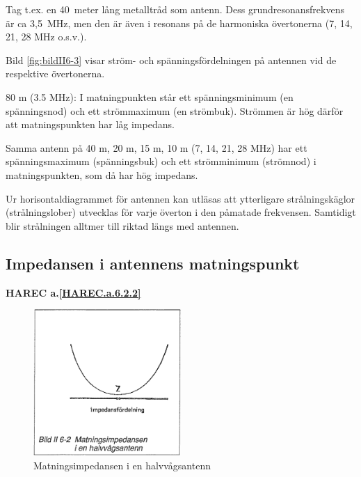 Tag t.ex. en 40~meter lång metalltråd som antenn. Dess
grundresonansfrekvens är ca 3,5~MHz, men den är även i resonans på de
harmoniska övertonerna (7, 14, 21, 28 MHz o.s.v.).

Bild \ref{fig:bildII6-3} visar ström- och spänningsfördelningen på antennen vid de
respektive övertonerna.

80 m (3.5 MHz): I matningpunkten står ett spänningsminimum (en
spänningsnod) och ett strömmaximum (en strömbuk). Strömmen är hög
därför att matningspunkten har låg impedans.

Samma antenn på 40 m, 20 m, 15 m, 10 m (7, 14, 21, 28 MHz) har ett
spänningsmaximum (spänningsbuk) och ett strömminimum (strömnod) i
matningspunkten, som då har hög impedans.

Ur horisontaldiagrammet för antennen kan utläsas att ytterligare
strålningskäglor (strålningslober) utvecklas för varje överton i den
påmatade frekvensen. Samtidigt blir strålningen alltmer till riktad
längs med antennen.

\subsection{Impedansen i antennens matningspunkt}
\textbf{
HAREC a.\ref{HAREC.a.6.2.2}\label{myHAREC.a.6.2.2}
}

\begin{figure}
  \includegraphics[width=0.5\textwidth]{images/bild_2_6-02}
  \caption{Matningsimpedansen i en halvvågsantenn}
  \label{fig:bildII6-2}
\end{figure}

